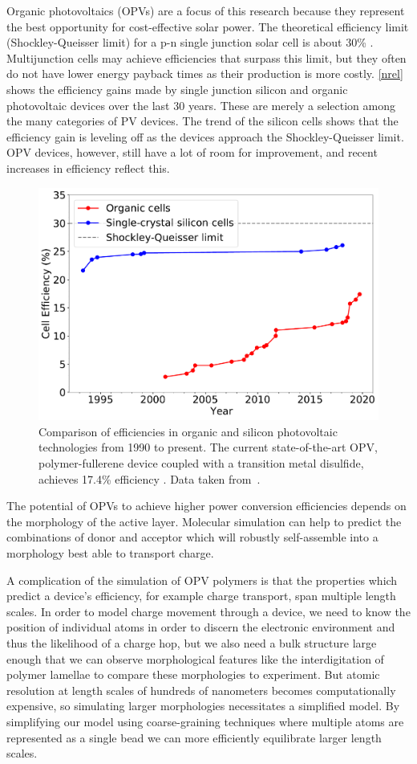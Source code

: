 Organic photovoltaics (OPVs) are a focus of this research because they represent the best opportunity for cost-effective solar power.
The theoretical efficiency limit (Shockley-Queisser limit) for a p-n single junction solar cell is about 30\% \citep{Shockley1961}.
Multijunction cells may achieve efficiencies that surpass this limit, but they often do not have lower energy payback times as their production is more costly.
\autoref{nrel} shows the efficiency gains made by single junction silicon and organic photovoltaic devices over the last 30 years.
These are merely a selection among the many categories of PV devices.
The trend of the silicon cells shows that the efficiency gain is leveling off as the devices approach the Shockley-Queisser limit.
OPV devices, however, still have a lot of room for improvement, and recent increases in efficiency reflect this.
\begin{figure}[h!]
    \centering
    \includegraphics[width=0.8\linewidth]{figures/p3ht_val/NREL2020.pdf}
    \caption{Comparison of efficiencies in organic and silicon photovoltaic technologies from 1990 to present. The current state-of-the-art OPV, polymer-fullerene device coupled with a transition metal disulfide, achieves 17.4\% efficiency \citep{Lin2019}. Data taken from~\citet{NREL2020}.}\label{nrel}
\end{figure}
The potential of OPVs to achieve higher power conversion efficiencies depends on the morphology of the active layer. 
Molecular simulation can help to predict the combinations of donor and acceptor which will robustly self-assemble into a morphology best able to transport charge. 

A complication of the simulation of OPV polymers is that the properties which predict a device's efficiency, for example charge transport, span multiple length scales.
In order to model charge movement through a device, we need to know the position of individual atoms in order to discern the electronic environment and thus the likelihood of a charge hop, but we also need a bulk structure large enough that we can observe morphological features like the interdigitation of polymer lamellae to compare these morphologies to experiment.
But atomic resolution at length scales of hundreds of nanometers becomes computationally expensive, so simulating larger morphologies necessitates a simplified model.
By simplifying our model using coarse-graining techniques where multiple atoms are represented as a single bead we can more efficiently equilibrate larger length scales.

